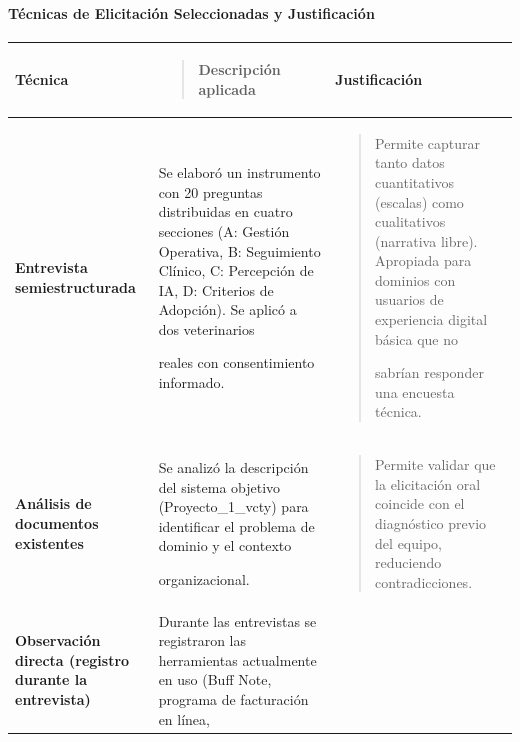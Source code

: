 \documentclass[
]{article}
\newcounter{none} %
\begin{document}
\paragraph{Técnicas de Elicitación Seleccionadas y
Justificación}\label{tuxe9cnicas-de-elicitaciuxf3n-seleccionadas-y-justificaciuxf3n}

{\def\LTcaptype{none} %
\begin{longtable}[]{@{}
  >{\raggedright\arraybackslash}p{}
  >{\raggedright\arraybackslash}p{}
  >{\raggedright\arraybackslash}p{}@{}}
\toprule\noalign{}
\begin{minipage}[b]{\linewidth}\centering
\textbf{Técnica}
\end{minipage} & \begin{minipage}[b]{\linewidth}\raggedright
\begin{quote}
\textbf{Descripción aplicada}
\end{quote}
\end{minipage} & \begin{minipage}[b]{\linewidth}\centering
\textbf{Justificación}
\end{minipage} \\
\midrule\noalign{}
\endhead
\bottomrule\noalign{}
\endlastfoot
\textbf{Entrevista semiestructurada} & Se elaboró un instrumento con 20
preguntas distribuidas en cuatro secciones (A: Gestión Operativa, B:
Seguimiento Clínico, C: Percepción de IA, D: Criterios de Adopción). Se
aplicó a dos veterinarios

reales con consentimiento informado. &
\begin{minipage}[t]{\linewidth}\raggedright
\begin{quote}
Permite capturar tanto datos cuantitativos (escalas) como cualitativos
(narrativa libre). Apropiada para dominios con usuarios de experiencia
digital básica que no

sabrían responder una encuesta técnica.
\end{quote}
\end{minipage} \\
\textbf{Análisis de documentos existentes} & Se analizó la descripción
del sistema objetivo (Proyecto\_1\_vcty) para identificar el problema de
dominio y el contexto

organizacional. & \begin{minipage}[t]{\linewidth}\raggedright
\begin{quote}
Permite validar que la elicitación oral coincide con el diagnóstico
previo del equipo, reduciendo contradicciones.
\end{quote}
\end{minipage} \\
\textbf{Observación directa (registro durante la entrevista)} & Durante
las entrevistas se registraron las herramientas actualmente en uso (Buff
Note, programa de facturación en línea,


\end{longtable}}
\end{document}
